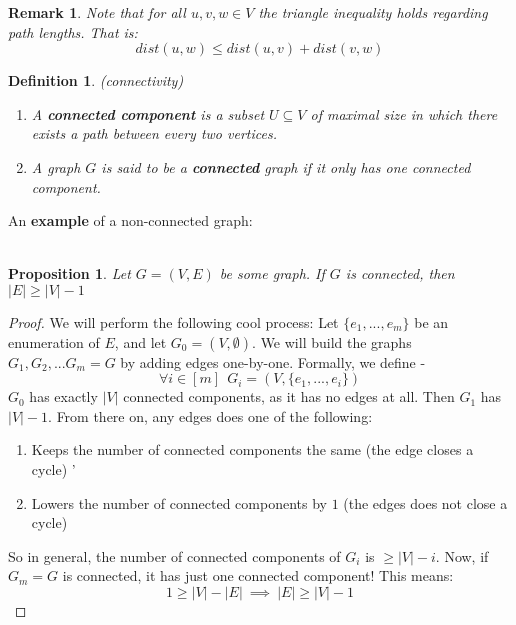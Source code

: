 \documentclass[12pt]{article}
\newtheorem{prop}{Proposition}
\newtheorem{definition}{Definition} \newtheorem{remark}{Remark}
\begin{document}
\begin{remark}
Note that for all $u,v,w\in V$ the triangle inequality holds regarding path lengths. That is:
$$dist(u,w)\leq dist(u,v) + dist(v, w)$$
\end{remark}

\begin{definition} (connectivity)
\begin{enumerate}
\item A \textbf{connected component} is a subset $U \subseteq V$ of maximal size in which there exists a path between every two vertices. 
\item A graph $G$ is said to be a \textbf{connected} graph if it only has one connected component.
\end{enumerate}
\end{definition}

An \textbf{example} of a non-connected graph: \\ \\ 

\begin{prop}
Let $G=(V,E)$ be some graph. If $G$ is connected, then $|E| \geq |V|-1$
\end{prop}

\begin{proof}
We will perform the following cool process: Let $\{e_1,...,e_m\}$ be an enumeration of $E$, and let $G_0=(V,\emptyset)$. We will build the graphs $G_1, G_2,... G_m=G$ by adding edges one-by-one. Formally, we define - 
$$\forall i\in[m]\ \ G_i=(V,\{e_1,...,e_i\})$$
$G_0$ has exactly $|V|$ connected components, as it has no edges at all. Then $G_1$ has $|V|-1$. From there on, any edges does one of the following:
\begin{enumerate}
    \item Keeps the number of connected components the same (the edge closes a cycle)
    '\item Lowers the number of connected components by $1$ (the edges does not close a cycle)
\end{enumerate}

So in general, the number of connected components of $G_i$ is $\geq |V|-i$. 
Now, if $G_m=G$ is connected, it has just one connected component! This means:
$$1 \geq |V| - |E|\ \implies \ |E|\geq|V|-1$$

\end{proof}
\end{document}
